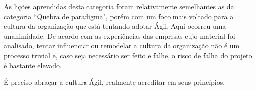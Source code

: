 As lições aprendidas desta categoria foram relativamente semelhantes as da categoria ``Quebra de paradigma", porém com um foco mais voltado para a cultura da organização que está tentando adotar Ágil. Aqui ocorreu uma unanimidade. De acordo com as experiências das empresas cujo material foi analisado, tentar influenciar ou remodelar a cultura da organização não é um processo trivial e, caso seja necessário ser feito e falhe, o risco de falha do projeto é bastante elevado.

É preciso abraçar a cultura Ágil, realmente acreditar em seus princípios.
